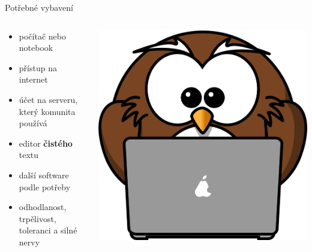 \documentclass[11pt]{beamer}
\begin{document}
 \begin{frame}{Potřebné vybavení}
 		\begin{columns}[T]
 		\begin{column}{0.5\textwidth}
 		\begin{itemize}
 			\item počítač nebo notebook
 			\item přístup na internet
 			\item účet na serveru, který komunita používá
 			\item editor \textbf{čistého} textu
 			\item další software podle potřeby
 			\item odhodlanost, trpělivost, toleranci a silné nervy
 		\end{itemize}		
 		\end{column}
 	\begin{column}{0.5\textwidth}
 		\includegraphics[width=\textwidth]{images/owl.png}
 	\end{column}
 	\end{columns}
\end{frame}
\end{document}
